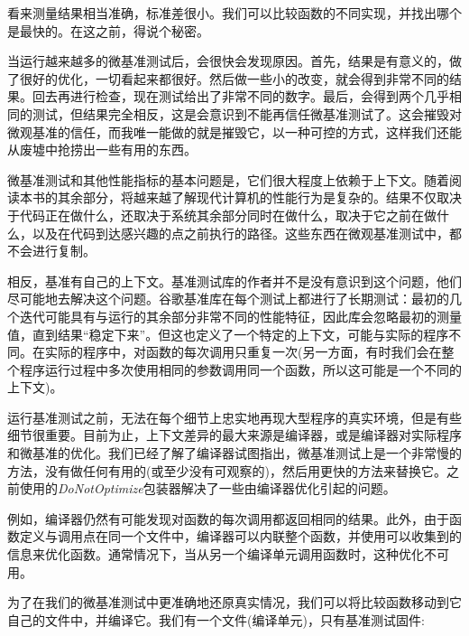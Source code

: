 看来测量结果相当准确，标准差很小。我们可以比较函数的不同实现，并找出哪个是最快的。在这之前，得说个秘密。


当运行越来越多的微基准测试后，会很快会发现原因。首先，结果是有意义的，做了很好的优化，一切看起来都很好。然后做一些小的改变，就会得到非常不同的结果。回去再进行检查，现在测试给出了非常不同的数字。最后，会得到两个几乎相同的测试，但结果完全相反，这是会意识到不能再信任微基准测试了。这会摧毁对微观基准的信任，而我唯一能做的就是摧毁它，以一种可控的方式，这样我们还能从废墟中抢捞出一些有用的东西。

微基准测试和其他性能指标的基本问题是，它们很大程度上依赖于上下文。随着阅读本书的其余部分，将越来越了解现代计算机的性能行为是复杂的。结果不仅取决于代码正在做什么，还取决于系统其余部分同时在做什么，取决于它之前在做什么，以及在代码到达感兴趣的点之前执行的路径。这些东西在微观基准测试中，都不会进行复制。

相反，基准有自己的上下文。基准测试库的作者并不是没有意识到这个问题，他们尽可能地去解决这个问题。谷歌基准库在每个测试上都进行了长期测试：最初的几个迭代可能具有与运行的其余部分非常不同的性能特征，因此库会忽略最初的测量值，直到结果“稳定下来”。但这也定义了一个特定的上下文，可能与实际的程序不同。在实际的程序中，对函数的每次调用只重复一次(另一方面，有时我们会在整个程序运行过程中多次使用相同的参数调用同一个函数，所以这可能是一个不同的上下文)。

运行基准测试之前，无法在每个细节上忠实地再现大型程序的真实环境，但是有些细节很重要。目前为止，上下文差异的最大来源是编译器，或是编译器对实际程序和微基准的优化。我们已经了解了编译器试图指出，微基准测试上是一个非常慢的方法，没有做任何有用的(或至少没有可观察的)，然后用更快的方法来替换它。之前使用的\textit{DoNotOptimize}包装器解决了一些由编译器优化引起的问题。

例如，编译器仍然有可能发现对函数的每次调用都返回相同的结果。此外，由于函数定义与调用点在同一个文件中，编译器可以内联整个函数，并使用可以收集到的信息来优化函数。通常情况下，当从另一个编译单元调用函数时，这种优化不可用。

为了在我们的微基准测试中更准确地还原真实情况，我们可以将比较函数移动到它自己的文件中，并编译它。我们有一个文件(编译单元)，只有基准测试固件:

